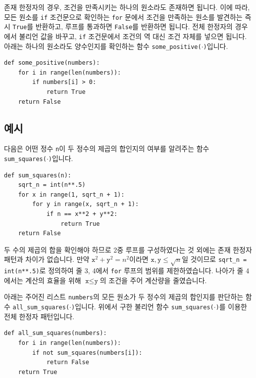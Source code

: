 \documentclass[../main.tex]{subfiles}
\begin{document}
존재 한정자의 경우, 조건을 만족시키는 하나의 원소라도 존재하면 됩니다.
이에 따라, 모든 원소를 \texttt{if} 조건문으로 확인하는 \texttt{for} 문에서 조건을 만족하는 원소를 발견하는 즉시 \texttt{True}를 반환하고, 루프를 통과하면 \texttt{False}를 반환하면 됩니다.
전체 한정자의 경우에서 불리언 값을 바꾸고, \texttt{if} 조건문에서 조건의 역 대신 조건 자체를 넣으면 됩니다.
아래는 하나의 원소라도 양수인지를 확인하는 함수 \texttt{some\_positive($\cdot$)}입니다.
\begin{verbatim}
def some_positive(numbers):
    for i in range(len(numbers)):
        if numbers[i] > 0:
            return True
    return False
\end{verbatim}

\subsection{예시}
다음은 어떤 정수 \texttt{n}이 두 정수의 제곱의 합인지의 여부를 알려주는 함수 \texttt{sum\_squares($\cdot$)}입니다.
\begin{verbatim}
def sum_squares(n):
    sqrt_n = int(n**.5)
    for x in range(1, sqrt_n + 1):
        for y in range(x, sqrt_n + 1):
            if n == x**2 + y**2:
                return True
    return False
\end{verbatim}
두 수의 제곱의 합을 확인해야 하므로 2중 루프를 구성하였다는 것 외에는 존재 한정자 패턴과 차이가 없습니다.
만약 $\texttt{x}^2 + \texttt{y}^2 = n^2$이라면 $\texttt{x}, \texttt{y} \leq \sqrt n$일 것이므로 \texttt{sqrt\_n = int(n**.5)}로 정의하여 줄 3, 4에서 \texttt{for} 루프의 범위를 제한하였습니다.
나아가 줄 4에서는 계산의 효율을 위해 $\texttt{x} \leq \texttt{y}$의 조건을 주어 계산량을 줄였습니다.

아래는 주어진 리스트 \texttt{numbers}의 모든 원소가 두 정수의 제곱의 합인지를 판단하는 함수 \texttt{all\_sum\_squares($\cdot$)}입니다.
위에서 구한 불리언 함수 \texttt{sum\_squares($\cdot$)}를 이용한 전체 한정자 패턴입니다.
\begin{verbatim}
def all_sum_squares(numbers):
    for i in range(len(numbers)):
        if not sum_squares(numbers[i]):
            return False
    return True
\end{verbatim}
\end{document}
